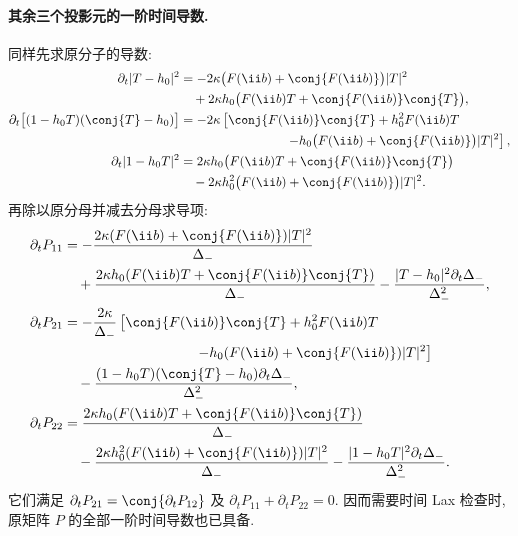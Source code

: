 \paragraph{其余三个投影元的一阶时间导数.}
同样先求原分子的导数:
\begin{align*}
\partial_t|T-h_0|^2
&=-2\kappa\bigl(F(\ii b)+\conj{F(\ii b)}\bigr)|T|^2\\
&\quad+2\kappa h_0
\bigl(F(\ii b)T+\conj{F(\ii b)}\conj{T}\bigr),\\
\partial_t\bigl[(1-h_0T)(\conj{T}-h_0)\bigr]
&=-2\kappa\left[
\conj{F(\ii b)}\conj{T}+h_0^2F(\ii b)T\right.\\
&\hspace{29mm}\left.
-h_0\bigl(F(\ii b)+\conj{F(\ii b)}\bigr)|T|^2\right],\\
\partial_t|1-h_0T|^2
&=2\kappa h_0
\bigl(F(\ii b)T+\conj{F(\ii b)}\conj{T}\bigr)\\
&\quad-2\kappa h_0^2
\bigl(F(\ii b)+\conj{F(\ii b)}\bigr)|T|^2.
\end{align*}
再除以原分母并减去分母求导项:
\begin{align*}
\partial_tP_{11}
&=-\dfrac{2\kappa(F(\ii b)+\conj{F(\ii b)})|T|^2}{\Delta_-}\\
&\quad+\dfrac{2\kappa h_0
(F(\ii b)T+\conj{F(\ii b)}\conj{T})}{\Delta_-}
-\dfrac{|T-h_0|^2\partial_t\Delta_-}{\Delta_-^2},\\
\partial_tP_{21}
&=-\dfrac{2\kappa}{\Delta_-}
\left[\conj{F(\ii b)}\conj{T}+h_0^2F(\ii b)T\right.\\
&\hspace{33mm}\left.
-h_0(F(\ii b)+\conj{F(\ii b)})|T|^2\right]\\
&\quad-\dfrac{(1-h_0T)(\conj{T}-h_0)
\partial_t\Delta_-}{\Delta_-^2},\\
\partial_tP_{22}
&=\dfrac{2\kappa h_0
(F(\ii b)T+\conj{F(\ii b)}\conj{T})}{\Delta_-}\\
&\quad-\dfrac{2\kappa h_0^2
(F(\ii b)+\conj{F(\ii b)})|T|^2}{\Delta_-}
-\dfrac{|1-h_0T|^2\partial_t\Delta_-}{\Delta_-^2}.
\end{align*}
它们满足 $\partial_tP_{21}=\conj{\partial_tP_{12}}$ 及 $\partial_tP_{11}+\partial_tP_{22}=0$. 因而需要时间 Lax 检查时, 原矩阵 $P$ 的全部一阶时间导数也已具备.

